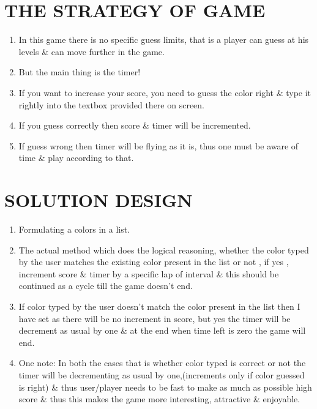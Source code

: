 \documentclass[12pt]{article}
\begin{document}
\section{THE STRATEGY OF GAME}
\begin{enumerate}
	\item In this game there is no specific guess limits, that is a player can guess at his levels \& can move further in the game.
	
	\item But the main thing is the timer!
	
	\item If you want to increase your score, you need to guess the color right \& type it rightly into the textbox provided there on screen.
	
	\item If you guess correctly then score \& timer will be incremented.
	
	\item If guess wrong then timer will be flying as it is, thus one must be aware of time \& play according to that.
\end{enumerate}

\section{SOLUTION DESIGN}
\begin{enumerate}
	
	\item Formulating a colors in a list.
	
	\item The actual method which does the logical reasoning, whether the color typed by the user matches the existing color present in the list or not , if yes , increment score \& timer by a specific lap of interval \& this should be continued as a cycle till the game doesn't end.
	
	\item If color typed by the user doesn't match the color present in the list then I have set as there will be no increment in score, but yes the timer will be decrement as usual by one \& at the end when time left is zero the game will end.
	
	\item One note: In both the cases that is whether color typed is correct or not the timer will be decrementing as usual by one,(increments only if color guessed is right) \& thus user/player needs to be fast to make as much as possible high score \& thus this makes the game more interesting, attractive \& enjoyable.  
\end{enumerate}
\end{document}
